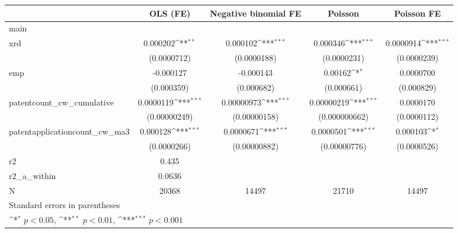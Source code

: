 {
\def\sym#1{\ifmmode^{#1}\else\(^{#1}\)\fi}
\begin{tabular}{l*{4}{c}}
\hline\hline
            &\multicolumn{1}{c}{OLS (FE)}&\multicolumn{1}{c}{Negative binomial FE}&\multicolumn{1}{c}{Poisson}&\multicolumn{1}{c}{Poisson FE}\\
\hline
main        &                     &                     &                     &                     \\
xrd         &    0.000202\sym{**} &    0.000102\sym{***}&    0.000346\sym{***}&   0.0000914\sym{***}\\
            & (0.0000712)         & (0.0000188)         & (0.0000231)         & (0.0000239)         \\
[1em]
emp         &   -0.000127         &   -0.000143         &     0.00162\sym{*}  &   0.0000700         \\
            &  (0.000359)         &  (0.000682)         &  (0.000661)         &  (0.000829)         \\
[1em]
patentcount\_cw\_cumulative&   0.0000119\sym{***}&  0.00000973\sym{***}&  0.00000219\sym{***}&   0.0000170         \\
            &(0.00000249)         &(0.00000158)         &(0.000000662)         & (0.0000112)         \\
[1em]
patentapplicationcount\_cw\_ma3&    0.000128\sym{***}&   0.0000671\sym{***}&   0.0000501\sym{***}&    0.000103\sym{*}  \\
            & (0.0000266)         &(0.00000882)         &(0.00000776)         & (0.0000526)         \\
\hline
r2          &       0.435         &                     &                     &                     \\
r2\_a\_within &      0.0636         &                     &                     &                     \\
N           &       20368         &       14497         &       21710         &       14497         \\
\hline\hline
\multicolumn{5}{l}{\footnotesize Standard errors in parentheses}\\
\multicolumn{5}{l}{\footnotesize \sym{*} \(p<0.05\), \sym{**} \(p<0.01\), \sym{***} \(p<0.001\)}\\
\end{tabular}
}
